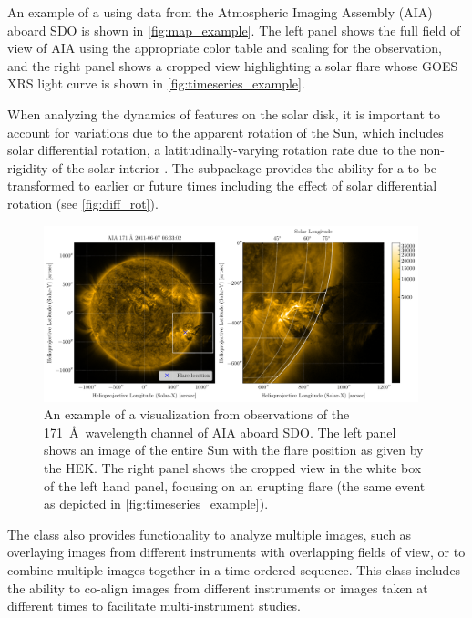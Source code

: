 An example of a \Map using data from the Atmospheric Imaging Assembly (AIA) aboard SDO is shown in \autoref{fig:map_example}.
The left panel shows the full field of view of AIA using the appropriate color table and scaling for the observation, and the right panel shows a cropped view highlighting a solar flare whose GOES XRS light curve is shown in \autoref{fig:timeseries_example}.

When analyzing the dynamics of features on the solar disk, it is important to account for variations due to the apparent rotation of the Sun, which includes solar differential rotation, a latitudinally-varying rotation rate due to the non-rigidity of the solar interior \citep[see][]{Beck2000}.
The  subpackage provides
the ability for a \Map to be transformed to earlier or future times including the effect of solar differential rotation (see \autoref{fig:diff_rot}).

\begin{figure}
    \centering
    \includegraphics[width=0.97\textwidth]{figures/map_example.pdf}
    \caption{An example of a \Map visualization from observations of the 171~\AA\ wavelength channel of AIA aboard SDO.
    The left panel shows an image of the entire Sun with the flare position as given by the HEK. The right panel shows the cropped view in the white box of the left hand panel, focusing on an erupting flare (the same event as depicted in \autoref{fig:timeseries_example}).}
    \label{fig:map_example}
\end{figure}

The \Map class also provides functionality to analyze multiple images, such as overlaying images from different instruments with overlapping fields of view, or to combine multiple images together in a time-ordered sequence.
This class includes the ability to co-align images from different instruments or images taken at different times to facilitate multi-instrument studies.


